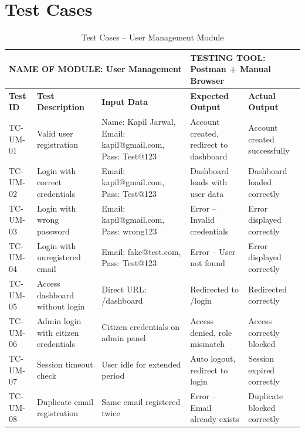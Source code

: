 \section{Test Cases}
\begin{table}[H]
\begin{center}
 \begin{tabular}{| m{1.2cm} | m{3.5cm} | m{2.2cm}| m{3cm}|m{3cm}| } 
\hline
\multicolumn{3}{|l|}{NAME OF MODULE: User Management}&
\multicolumn{2}{|l|}{TESTING TOOL: Postman + Manual Browser}\\[0.8cm]
\hline
\textbf{Test ID} & \textbf{Test Description} & \textbf{Input Data} & \textbf{Expected Output} & \textbf{Actual Output} \\ 
\hline
TC-UM-01 & Valid user registration & Name: Kapil Jarwal, Email: kapil@gmail.com, Pass: Test@123 & Account created, redirect to dashboard & Account created successfully \\
\hline
TC-UM-02 & Login with correct credentials & Email: kapil@gmail.com, Pass: Test@123 & Dashboard loads with user data & Dashboard loaded correctly \\
\hline
TC-UM-03 & Login with wrong password & Email: kapil@gmail.com, Pass: wrong123 & Error -- Invalid credentials & Error displayed correctly \\
\hline
TC-UM-04 & Login with unregistered email & Email: fake@test.com, Pass: Test@123 & Error -- User not found & Error displayed correctly \\
\hline
TC-UM-05 & Access dashboard without login & Direct URL: /dashboard & Redirected to /login & Redirected correctly \\
\hline
TC-UM-06 & Admin login with citizen credentials & Citizen credentials on admin panel & Access denied, role mismatch & Access correctly blocked \\
\hline
TC-UM-07 & Session timeout check & User idle for extended period & Auto logout, redirect to login & Session expired correctly \\
\hline
TC-UM-08 & Duplicate email registration & Same email registered twice & Error -- Email already exists & Duplicate blocked correctly \\
\hline
\end{tabular}
\caption{Test Cases -- User Management Module}
\end{center}
\end{table}

